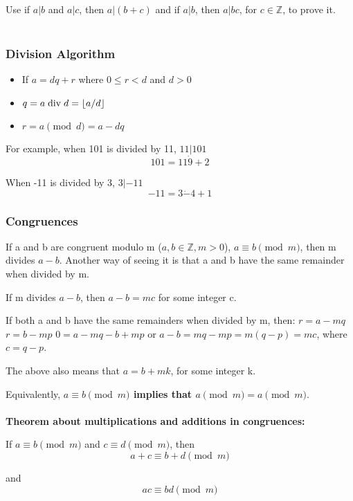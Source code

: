 Use if $a|b$ and $a|c$, then $a|(b+c)$ and if $a|b$, then $a|bc$, for $c \in \mathbb{Z}$, to prove it.
\\~\\



\subsubsection{Division Algorithm}

\begin{itemize}
\item If $a = dq + r$ where $0 \leq r < d$ and $d>0$
\item $q = a \bdiv d = \lfloor a/d \rfloor$
\item $r = a \pmod d = a - dq$
\end{itemize}

For example, when 101 is divided by 11, $11|101$
$$
101 = 11 \dot 9 + 2
$$

When -11 is divided by 3, $3|-11$
$$
-11 = 3 \dot -4 + 1
$$



\subsubsection{Congruences}

If a and b are congruent modulo m ($a,b \in \mathbb{Z}, m >0$), $a \equiv b \pmod m$, then m divides $a-b$.
Another way of seeing it is that a and b have the same remainder when divided by m.

If m divides $a-b$, then $a-b = mc$ for some integer c.

If both a and b have the same remainders when divided by m, then:
$r = a - mq$ 
$r = b - mp$
$0 = a - mq - b + mp$ or $a - b = mq - mp = m(q-p) = mc$, where $c = q-p$.

The above also means that $a = b + mk$, for some integer k.

Equivalently, \textbf{$a \equiv b \pmod m$ implies that $a \pmod m = a \pmod m$}.
\\~\\

\textbf{Theorem about multiplications and additions in congruences:}

If $a \equiv b \pmod m$ and $c \equiv d \pmod m$, then
\begin{equation}
    a + c \equiv b + d \pmod m
\end{equation}

and
\begin{equation}
    ac \equiv bd \pmod m
\end{equation}

